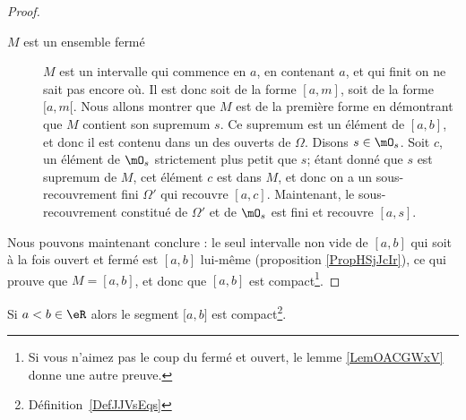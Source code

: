 \begin{proof}
\begin{description}
		\item[\( M\) est un ensemble fermé] \( M\) est un intervalle qui commence en \( a\), en contenant \( a\), et qui finit on ne sait pas encore où. Il est donc soit de la forme \( [a,m]\), soit de la forme \( [a,m[\). Nous allons montrer que \( M\) est de la première forme en démontrant que \( M\) contient son supremum \( s\). Ce supremum est un élément de \( [a,b]\), et donc il est contenu dans un des ouverts de \( \Omega\). Disons \( s\in\mO_s\). Soit \( c\), un élément de \( \mO_s\) strictement plus petit que \( s\); étant donné que \( s\) est supremum de \( M\), cet élément \( c\) est dans \( M\), et donc on a un sous-recouvrement fini \( \Omega'\) qui recouvre \( [a,c]\). Maintenant, le sous-recouvrement constitué de \( \Omega'\) et de \( \mO_s\) est fini et recouvre \( [a,s]\).
	\end{description}
	Nous pouvons maintenant conclure : le seul intervalle non vide de \( [a,b]\) qui soit à la fois ouvert et fermé est \( [a,b]\) lui-même (proposition \ref{PropHSjJcIr}), ce qui prouve que \( M=[a,b]\),
	et donc que \( [a,b]\) est compact\footnote{Si vous n'aimez pas le coup du fermé et ouvert, le lemme \ref{LemOACGWxV} donne une autre preuve.}.
\end{proof}

\begin{lemma}\label{LemOACGWxV}
	Si \( a<b\in \eR\) alors le segment \( \mathopen[ a , b \mathclose]\) est compact\footnote{Définition~\ref{DefJJVsEqs}}.
\end{lemma}

